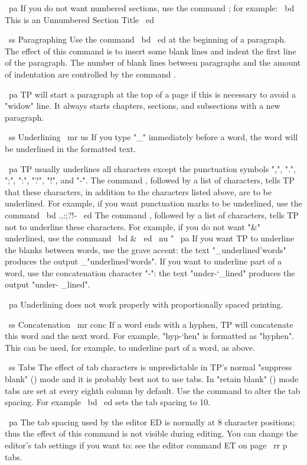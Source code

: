 ~pa If you do not want numbered sections, use the command \SU; for example:
~bd \SU This is an Unnumbered Section Title ~ed

~ss Paragraphing
Use the command ~bd \PA ~ed at the beginning of a paragraph.
The effect of this command is to insert some blank lines and indent
the first line of the paragraph.
The number of blank lines between paragraphs
and the amount of indentation are controlled by the command \PL.

~pa TP will start a paragraph at the top of a page if this is necessary
to avoid a "widow" line.
It always starts chapters, sections, and subsections with a new paragraph.

~ss Underlining
~mr us
If you type "_" immediately before a word, the word will be underlined
in the formatted text.

~pa TP usually underlines all characters except the punctuation symbols
",", ".", ";", ":", "?", "!", and "-".
The command \UL, followed by a list of characters, tells TP that
these characters, in addition to the characters listed above, are
to be underlined.
For example, if you want punctuation marks to be underlined, use the command
~bd \UL .,:;?!- ~ed
The command \NU, followed by a list of characters,
tells TP not to underline these characters.
For example, if you do not want "&" underlined, use the command
~bd \NU & ~ed
~nu "
~pa If you want TP to underline the blanks between words, use the grave
accent: the text "_underlined'words" produces the output _"underlined`words".
If you want to underline part of a word, use the concatenation character "-":
the text "under-`_lined" produces the output "under- _lined".

~pa Underlining does not work properly with proportionally spaced printing.

~ss Concatenation
~mr conc
If a word ends with a hyphen, TP will concatenate this word and the next word.
For example, "hyp-`hen" is formatted as "hyphen".
This can be used, for example, to underline part of a word, as above.

~ss Tabs
The effect of tab characters is unpredictable in TP's normal "suppress
blank" (\SB) mode and it is probably best not to use tabs.
In "retain blank" (\RB) mode tabs are set at every eighth column by default.
Use the command \TS to alter the tab spacing.
For example ~bd  ~ed sets the tab spacing to 10.

~pa The tab spacing used by the editor ED is normally at 8 character
positions; thus the effect of this command is not visible during
editing.
You can change the editor's tab settings if you want to: see the editor
command ET on page ~rr p tabs.

